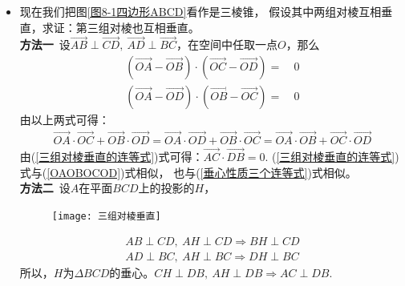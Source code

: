 \begin{itemize}[leftmargin=\inteval{\myitemleftmargin}pt,itemsep=
   \inteval{\myitemitempsep}pt,topsep=\inteval{\myitemtopsep}pt]
\item 现在我们把图\ref{图8-1四边形ABCD}看作是三棱锥，
假设其中两组对棱互相垂直，求证：第三组对棱也互相垂直。\\
\textbf{方法一}\ 设$ \vec{AB}\perp \vec{CD},\ 
\vec{AD}\perp \vec{BC} $，在空间中任取一点$ O $，那么
\begin{align*}
    (\vec{OA}-\vec{OB})\cdot
    (\vec{OC}-\vec{OD}) =&\ 0  \\
    (\vec{OA}-\vec{OD})\cdot
    (\vec{OB}-\vec{OC}) =&\ 0 
\end{align*}
由以上两式可得：
\begin{align}\label{三组对棱垂直的连等式}
    \vec{OA}\cdot \vec{OC}+
    \vec{OB}\cdot \vec{OD}=
    \vec{OA}\cdot \vec{OD}+
    \vec{OB}\cdot \vec{OC}=
    \vec{OA}\cdot \vec{OB}+
    \vec{OC}\cdot \vec{OD}
\end{align}
由(\ref{三组对棱垂直的连等式})式可得：$ \vec{AC}\cdot
\vec{DB}=0 $. (\ref{三组对棱垂直的连等式})式与(\ref{OAOBOCOD})式相似，
也与(\ref{垂心性质三个连等式})式相似。\\
\textbf{方法二}\ 设$ A $在平面$ BCD $上的投影的$ H $，
\begin{figure}[h]
    \centering
    \texttt{[image: 三组对棱垂直]}
\end{figure}
\begin{align*}
    AB\perp CD,\ AH\perp CD \Rightarrow BH\perp CD \\
    AD\perp BC,\ AH\perp BC \Rightarrow DH\perp BC 
\end{align*}
所以，$ H $为$ \Delta BCD $的垂心。$ CH\perp DB,\ AH\perp DB \Rightarrow 
AC\perp DB $. 


\end{itemize}
